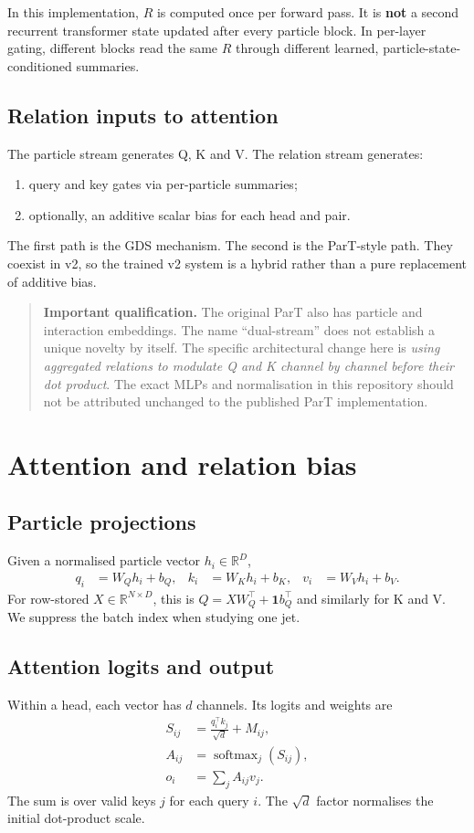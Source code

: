 \documentclass[11pt,a4paper]{article}
\newcommand{\R}{\mathbb R}
\newcommand{\softmax}{\operatorname{softmax}}
\newenvironment{caution}{\begin{quote}\textbf{Important qualification.} }{\end{quote}}
\numberwithin{equation}{section}
\begin{document}
In this implementation, $R$ is computed once per forward pass.
It is \textbf{not} a second recurrent transformer state updated after every
particle block. In per-layer gating, different blocks read the same $R$
through different learned, particle-state-conditioned summaries.

\subsection{Relation inputs to attention}
The particle stream generates Q, K and V. The relation stream generates:
\begin{enumerate}
 \item query and key gates via per-particle summaries;
 \item optionally, an additive scalar bias for each head and pair.
\end{enumerate}
The first path is the GDS mechanism. The second is the ParT-style path.
They coexist in v2, so the trained v2 system is a hybrid rather than a
pure replacement of additive bias.

\begin{caution}
The original ParT also has particle and interaction embeddings. The name
``dual-stream'' does not establish a unique novelty by itself.
The specific architectural change here is \emph{using aggregated relations
to modulate Q and K channel by channel before their dot product}.
The exact MLPs and normalisation in this repository should not be attributed
unchanged to the published ParT implementation.
\end{caution}

\section{Attention and relation bias}\label{sec:attn}
\subsection{Particle projections}
Given a normalised particle vector $h_i\in\R^D$,
\begin{align}
 q_i&=W_Qh_i+b_Q,& k_i&=W_Kh_i+b_K,& v_i&=W_Vh_i+b_V.
\end{align}
For row-stored $X\in\R^{N\times D}$, this is
$Q=XW_Q^\top+\mathbf1 b_Q^\top$ and similarly for K and V.
We suppress the batch index when studying one jet.

\subsection{Attention logits and output}
Within a head, each vector has $d$ channels. Its logits and weights are
\begin{align}
 S_{ij}&=\frac{q_i^\top k_j}{\sqrt d}+M_{ij},\\
 A_{ij}&=\softmax_j(S_{ij}),\\
 o_i&=\sum_j A_{ij}v_j.\label{eq:attnoutput}
\end{align}
The sum is over valid keys $j$ for each query $i$.
The $\sqrt d$ factor normalises the initial dot-product scale.
\end{document}
